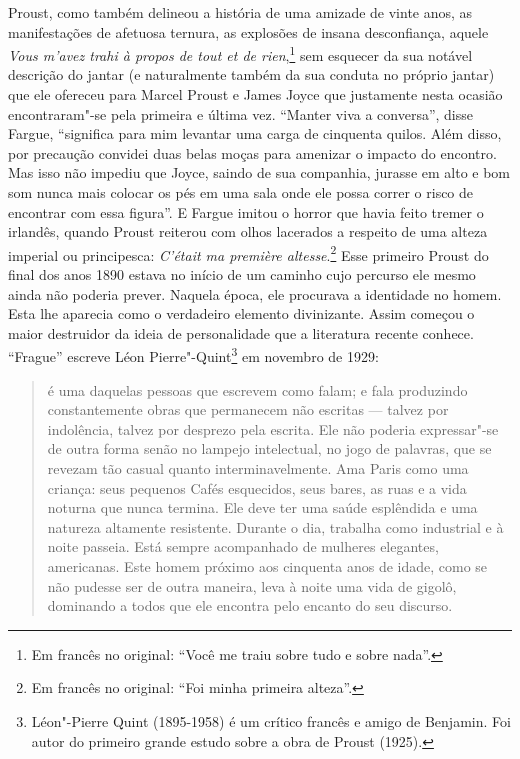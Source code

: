Proust, como também delineou a história de uma amizade de vinte anos, as
manifestações de afetuosa ternura, as explosões de insana desconfiança,
aquele \emph{Vous m'avez trahi à propos de tout et de rien},\footnote{Em francês no original: ``Você me traiu sobre tudo e sobre nada''. \versal{[N. T.]}}
sem esquecer da sua notável descrição do jantar (e naturalmente também
da sua conduta no próprio jantar) que ele ofereceu para Marcel Proust e
James Joyce que justamente nesta ocasião encontraram"-se pela primeira e
última vez. ``Manter viva a conversa'', disse Fargue, ``significa para
mim levantar uma carga de cinquenta quilos. Além disso, por precaução
convidei duas belas moças para amenizar o impacto do encontro. Mas isso
não impediu que Joyce, saindo de sua companhia, jurasse em alto e bom
som nunca mais colocar os pés em uma sala onde ele possa correr o risco
de encontrar com essa figura''. E Fargue imitou o horror que havia feito
tremer o irlandês, quando Proust reiterou com olhos lacerados a respeito
de uma alteza imperial ou principesca: \emph{C'était ma première
altesse}.\footnote{Em francês no original: ``Foi minha primeira alteza''. \versal{[N. T.]}} Esse primeiro Proust do final dos anos 1890 estava no
início de um caminho cujo percurso ele mesmo ainda não poderia prever.
Naquela época, ele procurava a identidade no homem. Esta lhe aparecia
como o verdadeiro elemento divinizante. Assim começou o maior destruidor
da ideia de personalidade que a literatura recente conhece. ``Frague''
escreve Léon Pierre"-Quint\footnote{Léon"-Pierre Quint (1895-1958) é
  um crítico francês e amigo de Benjamin. Foi autor do primeiro grande
  estudo sobre a obra de Proust (1925). \versal{[N. E.]}} em novembro de 1929:

\begin{quote}
é uma daquelas pessoas que escrevem como falam; e fala produzindo
constantemente obras que permanecem não escritas --- talvez por
indolência, talvez por desprezo pela escrita. Ele não poderia
expressar"-se de outra forma senão no lampejo intelectual, no jogo de
palavras, que se revezam tão casual quanto interminavelmente. Ama Paris
como uma criança: seus pequenos Cafés esquecidos, seus bares, as ruas e
a vida noturna que nunca termina. Ele deve ter uma saúde esplêndida e
uma natureza altamente resistente. Durante o dia, trabalha como
industrial e à noite passeia. Está sempre acompanhado de mulheres
elegantes, americanas. Este homem próximo aos cinquenta anos de idade,
como se não pudesse ser de outra maneira, leva à noite uma vida de
gigolô, dominando a todos que ele encontra pelo encanto do seu discurso.
\end{quote}

